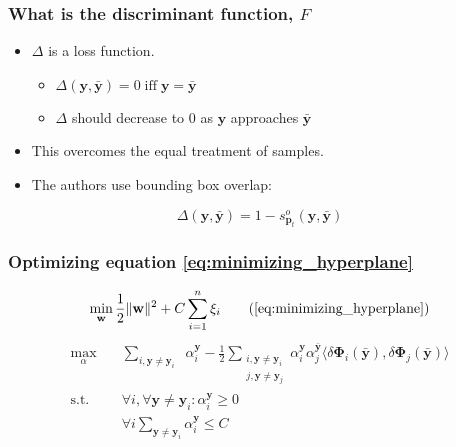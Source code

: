 \documentclass[mathserif,handout]{beamer}
\DeclareMathOperator{\struckDelta}{\Delta \left( \mathbf{y}, \mathbf{y}_i \right)}
\DeclareMathOperator{\st}{\text{s.t.} \quad}
\begin{document}
\begin{frame}
    \frametitle{What is the discriminant function, $F$}
    \begin{itemize}
        \item $\Delta$ is a loss function.
            \begin{itemize}
                \item $\Delta (\mathbf{y}, \mathbf{\bar{y}}) = 0 \; \text{iff} \; \mathbf{y} = \mathbf{\bar{y}}$
                \item $\Delta$ should decrease to 0 as $\mathbf{y}$ approaches $\mathbf{\bar{y}}$
            \end{itemize}
        \item This overcomes the equal treatment of samples.
        \item The authors use bounding box overlap:
    \end{itemize}
    \begin{equation}
        \Delta(\mathbf{y}, \mathbf{\bar{y}}) = 1 - s_{\mathbf{p}_t}^o (\mathbf{y}, \mathbf{\bar{y}})
    \end{equation}
\end{frame}

\begin{frame}
    \frametitle{Optimizing equation \eqref{eq:minimizing_hyperplane}}
    \begin{equation}
        \min_{\mathbf{w}} \frac{1}{2} \|\mathbf{w}\|^2 + C \sum_{i=1}^n \xi_i \tag{\ref{eq:minimizing_hyperplane}}
    \end{equation}
    \begin{equation}
    \begin{aligned}
        \max_{\alpha} \quad & \sum_{i, \mathbf{y} \ne \mathbf{y}_i} \struckDelta \alpha_i^\mathbf{y} -
            \frac{1}{2} \sum_{\substack{i, \mathbf{y} \ne \mathbf{y}_i \\ j, \mathbf{y} \ne \mathbf{y}_j}}
            \alpha_i^\mathbf{y} \alpha_j^\mathbf{\bar{y}} \langle \delta \mathbf{\Phi}_i \left( \mathbf{\bar{y}} \right), \delta \mathbf{\Phi}_j \left( \mathbf{\bar{y}} \right) \rangle \\
            \st & \forall i, \forall \mathbf{y} \ne \mathbf{y}_i : \alpha_i^\mathbf{y} \ge 0 \\
                & \forall i \sum_{\mathbf{y} \ne \mathbf{y}_i} \alpha_i^\mathbf{y} \le C
    \end{aligned}
    \end{equation}
\end{frame}
\end{document}
